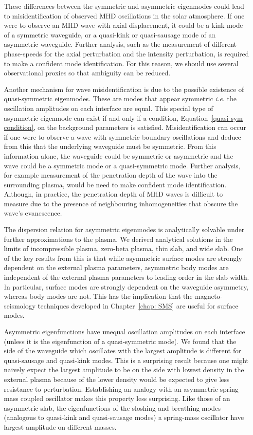 These differences between the symmetric and asymmetric eigenmodes could lead to misidentification of observed MHD oscillations in the solar atmosphere. If one were to observe an MHD wave with axial displacement, it could be a kink mode of a symmetric waveguide, or a quasi-kink or quasi-sausage mode of an asymmetric waveguide. Further analysis, such as the measurement of different phase-speeds for the axial perturbation and the intensity perturbation, is required to make a confident mode identification. For this reason, we should use several observational proxies so that ambiguity can be reduced.

Another mechanism for wave misidentification is due to the possible existence of quasi-symmetric eigenmodes. These are modes that appear symmetric \textit{i.e.} the oscillation amplitudes on each interface are equal. This special type of asymmetric eigenmode can exist if and only if a condition, Equation~\eqref{quasi-sym condition}, on the background parameters is satisfied. Misidentification can occur if one were to observe a wave with symmetric boundary oscillations and deduce from this that the underlying waveguide must be symmetric. From this information alone, the waveguide could be symmetric or asymmetric and the wave could be a symmetric mode or a quasi-symmetric mode. Further analysis, for example measurement of the penetration depth of the wave into the surrounding plasma, would be need to make confident mode identification. Although, in practice, the penetration depth of MHD waves is difficult to measure due to the presence of neighbouring inhomogeneities that obscure the wave's evanescence.

The dispersion relation for asymmetric eigenmodes is analytically solvable under further approximations to the plasma. We derived analytical solutions in the limits of incompressible plasma, zero-beta plasma, thin slab, and wide slab. One of the key results from this is that while asymmetric surface modes are strongly dependent on the external plasma parameters, asymmetric body modes are independent of the external plasma parameters to leading order in the slab width. In particular, surface modes are strongly dependent on the waveguide asymmetry, whereas body modes are not. This has the implication that the magneto-seismology techniques developed in Chapter~\ref{chap: SMS} are useful for surface modes.

Asymmetric eigenfunctions have unequal oscillation amplitudes on each interface (unless it is the eigenfunction of a quasi-symmetric mode). We found that the side of the waveguide which oscillates with the largest amplitude is different for quasi-sausage and quasi-kink modes. This is a surprising result because one might naively expect the largest amplitude to be on the side with lowest density in the external plasma because of the lower density would be expected to give less resistance to perturbation. Establishing an analogy with an asymmetric spring-mass coupled oscillator makes this property less surprising. Like those of an asymmetric slab, the eigenfunctions of the sloshing and breathing modes (analogous to quasi-kink and quasi-sausage modes) a spring-mass oscillator have largest amplitude on different masses.